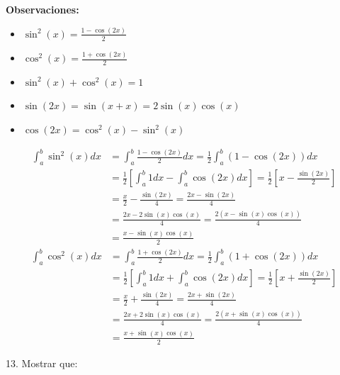 \documentclass[12pt]{article}
\begin{document}
\begin{enumerate}[\hspace{9px} a)]
        \textbf{Observaciones:}
        \begin{itemize}
            \item \(\sin^2(x) = \displaystyle\frac{1-\cos(2x)}{2}\)
            \item \(\cos^2(x) = \displaystyle\frac{1+\cos(2x)}{2}\)
            \item \(\sin^2(x)+\cos^2(x)=1\)
            \item \(\sin(2x) = \sin(x+x)=2\sin(x)\cos(x)\)
            \item \(\cos(2x) = \cos^2(x)-\sin^2(x)\)
        \end{itemize}
        \begin{align*}
            \int_{a}^{b}\sin^2(x)dx& = \int_{a}^{b}\frac{1-\cos(2x)}{2}dx = \frac{1}{2}\int_{a}^{b}(1-\cos(2x))dx \\
            &= \frac{1}{2}\left[\int_{a}^{b}1dx - \int_{a}^{b}\cos(2x)dx\right] = \frac{1}{2}\left[x - \frac{\sin(2x)}{2}\right] \\
            &=\frac{x}{2} - \frac{\sin(2x)}{4} = \frac{2x-\sin(2x)}{4} \\
            &= \frac{2x-2\sin(x)\cos(x)}{4} = \frac{2(x-\sin(x)\cos(x))}{4} \\
            &= \frac{x-\sin(x)\cos(x)}{2}
        \end{align*}
        \begin{align*}
            \int_{a}^{b}\cos^2(x)dx& = \int_{a}^{b}\frac{1+\cos(2x)}{2}dx = \frac{1}{2}\int_{a}^{b}(1+\cos(2x))dx \\
            &= \frac{1}{2}\left[\int_{a}^{b}1dx + \int_{a}^{b}\cos(2x)dx\right] = \frac{1}{2}\left[x + \frac{\sin(2x)}{2}\right] \\
            &=\frac{x}{2} + \frac{\sin(2x)}{4} = \frac{2x+\sin(2x)}{4} \\
            &= \frac{2x+2\sin(x)\cos(x)}{4} = \frac{2(x+\sin(x)\cos(x))}{4} \\
            &= \frac{x+\sin(x)\cos(x)}{2}
        \end{align*}

\end{enumerate}

13. Mostrar que:
\end{document}
